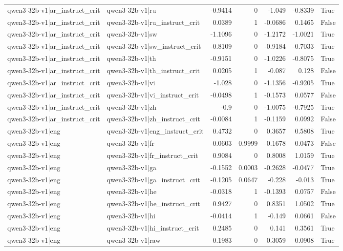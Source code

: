 \begin{table}
\begin{tabular}{l l r r r r l}
qwen3-32b-v1|ar_instruct_crit & qwen3-32b-v1|ru & -0.9414 & 0 & -1.049 & -0.8339 & True \\
qwen3-32b-v1|ar_instruct_crit & qwen3-32b-v1|ru_instruct_crit & 0.0389 & 1 & -0.0686 & 0.1465 & False \\
qwen3-32b-v1|ar_instruct_crit & qwen3-32b-v1|sw & -1.1096 & 0 & -1.2172 & -1.0021 & True \\
qwen3-32b-v1|ar_instruct_crit & qwen3-32b-v1|sw_instruct_crit & -0.8109 & 0 & -0.9184 & -0.7033 & True \\
qwen3-32b-v1|ar_instruct_crit & qwen3-32b-v1|th & -0.9151 & 0 & -1.0226 & -0.8075 & True \\
qwen3-32b-v1|ar_instruct_crit & qwen3-32b-v1|th_instruct_crit & 0.0205 & 1 & -0.087 & 0.128 & False \\
qwen3-32b-v1|ar_instruct_crit & qwen3-32b-v1|vi & -1.028 & 0 & -1.1356 & -0.9205 & True \\
qwen3-32b-v1|ar_instruct_crit & qwen3-32b-v1|vi_instruct_crit & -0.0498 & 1 & -0.1573 & 0.0577 & False \\
qwen3-32b-v1|ar_instruct_crit & qwen3-32b-v1|zh & -0.9 & 0 & -1.0075 & -0.7925 & True \\
qwen3-32b-v1|ar_instruct_crit & qwen3-32b-v1|zh_instruct_crit & -0.0084 & 1 & -0.1159 & 0.0992 & False \\
qwen3-32b-v1|eng & qwen3-32b-v1|eng_instruct_crit & 0.4732 & 0 & 0.3657 & 0.5808 & True \\
qwen3-32b-v1|eng & qwen3-32b-v1|fr & -0.0603 & 0.9999 & -0.1678 & 0.0473 & False \\
qwen3-32b-v1|eng & qwen3-32b-v1|fr_instruct_crit & 0.9084 & 0 & 0.8008 & 1.0159 & True \\
qwen3-32b-v1|eng & qwen3-32b-v1|ga & -0.1552 & 0.0003 & -0.2628 & -0.0477 & True \\
qwen3-32b-v1|eng & qwen3-32b-v1|ga_instruct_crit & -0.1205 & 0.0647 & -0.228 & -0.013 & True \\
qwen3-32b-v1|eng & qwen3-32b-v1|he & -0.0318 & 1 & -0.1393 & 0.0757 & False \\
qwen3-32b-v1|eng & qwen3-32b-v1|he_instruct_crit & 0.9427 & 0 & 0.8351 & 1.0502 & True \\
qwen3-32b-v1|eng & qwen3-32b-v1|hi & -0.0414 & 1 & -0.149 & 0.0661 & False \\
qwen3-32b-v1|eng & qwen3-32b-v1|hi_instruct_crit & 0.2485 & 0 & 0.141 & 0.3561 & True \\
qwen3-32b-v1|eng & qwen3-32b-v1|raw & -0.1983 & 0 & -0.3059 & -0.0908 & True \\

\end{tabular}
\end{table}
